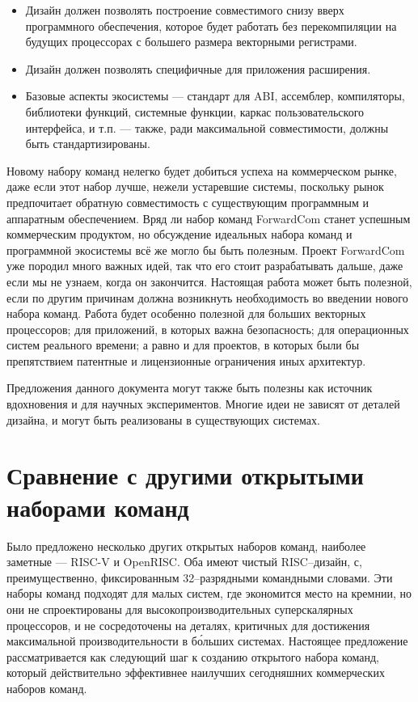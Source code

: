 \documentclass[forwardcom.tex]{subfiles}
\begin{document}
\begin{itemize}
\item Дизайн должен позволять построение совместимого снизу вверх программного обеспечения, которое будет работать без перекомпиляции на будущих процессорах с большего размера векторными регистрами.

\item Дизайн должен позволять специфичные для приложения расширения.

\item Базовые аспекты экосистемы --- стандарт для ABI, ассемблер, компиляторы, библиотеки функций, системные функции, каркас пользовательского интерфейса, и т.п. --- также, ради максимальной совместимости, должны быть стандартизированы.
\end{itemize}

Новому набору команд нелегко будет добиться успеха на коммерческом рынке, даже если этот набор лучше, нежели устаревшие системы, поскольку рынок предпочитает обратную совместимость с существующим программным и аппаратным обеспечением. Вряд ли набор команд ForwardCom станет успешным коммерческим продуктом, но обсуждение идеальных набора команд и программной экосистемы всё же могло бы быть полезным. Проект ForwardCom уже породил много важных идей, так что его стоит разрабатывать дальше, даже если мы не узнаем, когда он закончится. Настоящая работа может быть полезной, если по другим причинам должна возникнуть необходимость во введении нового набора команд. Работа будет особенно полезной для больших векторных процессоров; для приложений, в которых важна безопасность; для операционных систем реального времени; а равно и для проектов, в которых были бы препятствием патентные и лицензионные ограничения иных архитектур.

Предложения данного документа могут также быть полезны как источник вдохновения и для научных экспериментов. Многие идеи не зависят от деталей дизайна, и могут быть реализованы в существующих системах.

\section{Сравнение с другими открытыми наборами команд}
Было предложено несколько других открытых наборов команд, наиболее заметные --- RISC-V и OpenRISC. Оба имеют чистый RISC--дизайн, с, преимущественно, фиксированным 32--разрядными командными словами. Эти наборы команд подходят для малых систем, где экономится место на кремнии, но они не спроектированы для высокопроизводительных суперскалярных процессоров, и не сосредоточены на деталях, критичных для достижения максимальной производительности в б\'{о}льших системах. Настоящее предложение рассматривается как следующий шаг к созданию открытого набора команд, который действительно эффективнее наилучших сегодняшних коммерческих наборов команд.
\end{document}
